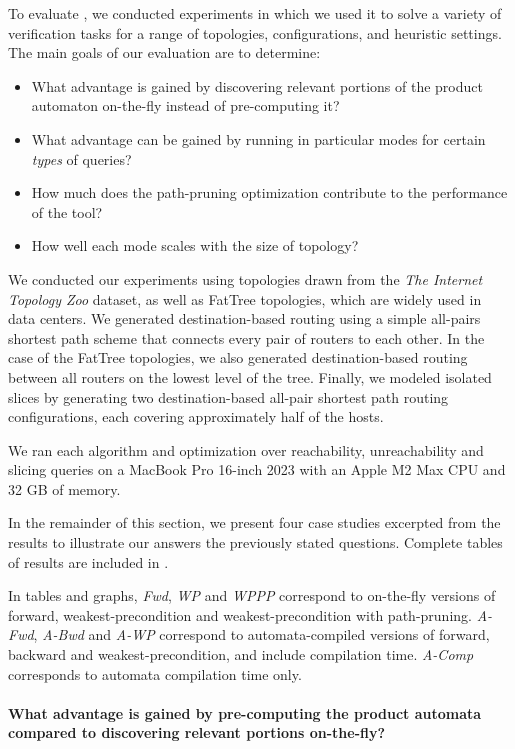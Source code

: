 
To evaluate \FiveStars, we conducted experiments in which we used it
to solve a variety of verification tasks for a range of topologies,
configurations, and heuristic settings. The main goals of our
evaluation are to determine:
\begin{itemize}
\item What advantage is gained by discovering relevant portions of the product
automaton on-the-fly instead of pre-computing it?
\item What advantage can be gained by running \FiveStars in particular modes for
      certain \emph{types} of queries?
\item How much does the path-pruning optimization contribute to the performance of the tool?      
\item How well each mode scales with the size of topology?
\end{itemize}

We conducted our experiments using topologies drawn from
the \emph{The Internet Topology Zoo} \citep{topologyzoo} dataset, as
well as FatTree topologies, which are widely used in data centers. We
generated destination-based routing using a simple all-pairs shortest
path scheme that connects every pair of routers to each other. In the
case of the FatTree topologies, we also generated destination-based
routing between all routers on the lowest level of the tree.  Finally,
we modeled isolated slices by generating two destination-based
all-pair shortest path routing configurations, each covering
approximately half of the hosts.

We ran each algorithm and optimization over reachability,
unreachability and slicing queries on a MacBook Pro 16-inch 2023 with
an Apple M2 Max CPU and 32 GB of memory.

In the remainder of this section, we present four case studies
excerpted from the results to illustrate our answers the previously
stated questions. Complete tables of results are included
in .

In tables and graphs, \emph{Fwd}, \emph{WP} and \emph{WPPP} correspond to on-the-fly versions of forward, weakest-precondition and weakest-precondition with path-pruning. \emph{A-Fwd}, \emph{A-Bwd} and \emph{A-WP} correspond to automata-compiled versions of forward, backward and weakest-precondition, and include compilation time. \emph{A-Comp} corresponds to automata compilation time only.

\paragraph{What advantage is gained by pre-computing the product automata compared to
discovering relevant portions on-the-fly?}

